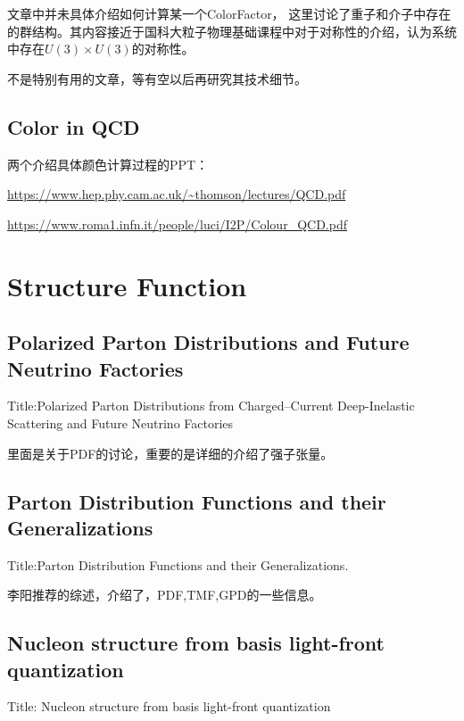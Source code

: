 \documentclass{article}
\begin{document}
文章中并未具体介绍如何计算某一个ColorFactor， 这里讨论了重子和介子中存在的群结构。其内容接近于国科大粒子物理基础课程中对于对称性的介绍，认为系统中存在$U(3) \times U(3)$的对称性。

不是特别有用的文章，等有空以后再研究其技术细节。



\subsection{Color in QCD}

两个介绍具体颜色计算过程的PPT：

\url{https://www.hep.phy.cam.ac.uk/~thomson/lectures/QCD.pdf}

\url{https://www.roma1.infn.it/people/luci/I2P/Colour_QCD.pdf}





\section{Structure Function}

\subsection{Polarized Parton Distributions and Future Neutrino Factories}


Title:Polarized Parton Distributions from Charged–Current Deep-Inelastic Scattering and Future Neutrino Factories \cite{Forte:2001ph}

里面是关于PDF的讨论，重要的是详细的介绍了强子张量。

\subsection{Parton Distribution Functions and their Generalizations}

Title:Parton Distribution Functions and their Generalizations\cite{partondistributionfunctionsgeneralizations}.

李阳推荐的综述，介绍了，PDF,TMF,GPD的一些信息。

\subsection{Nucleon structure from basis light-front quantization}

Title: \quad Nucleon structure from basis light-front quantization\cite{Xu_2021}
\end{document}
